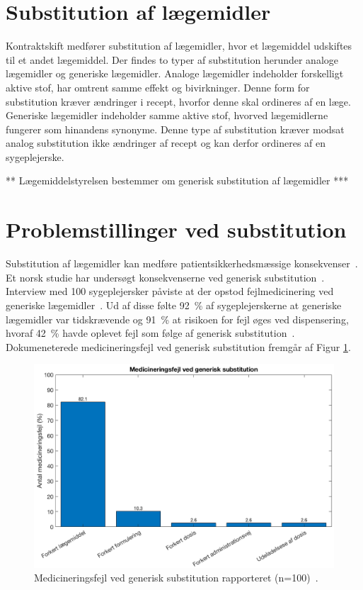 \section{Substitution af lægemidler}
Kontraktskift medfører substitution af lægemidler, hvor et lægemiddel udskiftes til et andet lægemiddel. Der findes to typer af substitution herunder analoge lægemidler og generiske lægemidler. Analoge lægemidler indeholder forskelligt aktive stof, har omtrent samme effekt og bivirkninger. Denne form for substitution kræver ændringer i  recept, hvorfor denne skal ordineres af en læge. Generiske lægemidler indeholder samme aktive stof, hvorved lægemidlerne fungerer som hinandens synonyme. Denne type af substitution kræver modsat analog substitution ikke ændringer af recept og kan derfor ordineres af en sygeplejerske. 

** Lægemiddelstyrelsen bestemmer om generisk substitution af lægemidler ***


\section{Problemstillinger ved substitution}
Substitution af lægemidler kan medføre patientsikkerhedsmæssige konsekvenser~\citep{DanskSelskabforPatientsikkerhed2009}. Et norsk studie har undersøgt konsekvenserne ved generisk substitution~\citep{Hakonsen2010}. Interview med 100 sygeplejersker påviste at der opstod fejlmedicinering ved generiske lægemidler~\citep{Hakonsen2010}. Ud af disse følte 92~\% af sygeplejerskerne at generiske lægemidler var tidskrævende og 91~\% at risikoen for fejl øges ved dispensering, hvoraf 42~\% havde oplevet fejl som følge af generisk substitution~\citep{Hakonsen2010}. Dokumeneterede medicineringsfejl ved generisk substitution fremgår af Figur \ref{fig:GeneriskSubstitution}.

\begin{figure}[H]\centering	\includegraphics[width=1\textwidth]{billeder/GenSub.png} 
	\caption{Medicineringsfejl ved generisk substitution rapporteret (n=100)~\citep{Hakonsen2010}.}
	\label{fig:GeneriskSubstitution}  
\end{figure}

